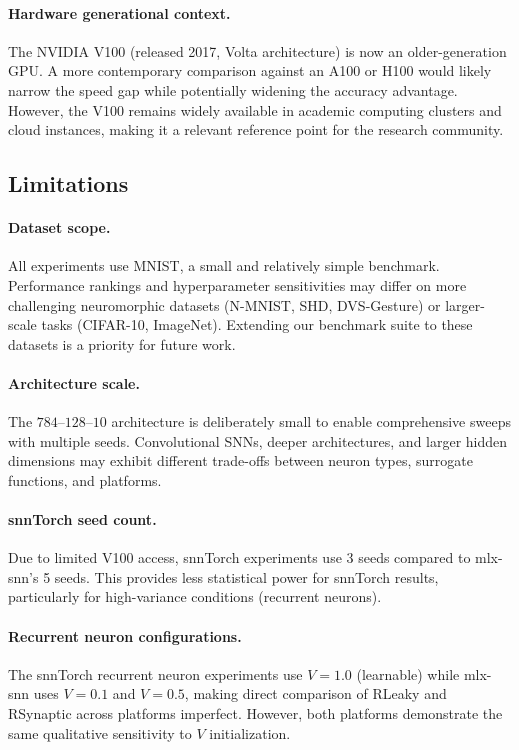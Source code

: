 \documentclass[11pt]{article}
\begin{document}
\paragraph{Hardware generational context.}
The NVIDIA V100 (released 2017, Volta architecture) is now an older-generation GPU. A more contemporary comparison against an A100 or H100 would likely narrow the speed gap while potentially widening the accuracy advantage. However, the V100 remains widely available in academic computing clusters and cloud instances, making it a relevant reference point for the research community.

\subsection{Limitations}

\paragraph{Dataset scope.}
All experiments use MNIST, a small and relatively simple benchmark. Performance rankings and hyperparameter sensitivities may differ on more challenging neuromorphic datasets (N-MNIST, SHD, DVS-Gesture) or larger-scale tasks (CIFAR-10, ImageNet). Extending our benchmark suite to these datasets is a priority for future work.

\paragraph{Architecture scale.}
The $784$--$128$--$10$ architecture is deliberately small to enable comprehensive sweeps with multiple seeds. Convolutional SNNs, deeper architectures, and larger hidden dimensions may exhibit different trade-offs between neuron types, surrogate functions, and platforms.

\paragraph{snnTorch seed count.}
Due to limited V100 access, snnTorch experiments use 3 seeds compared to mlx-snn's 5 seeds. This provides less statistical power for snnTorch results, particularly for high-variance conditions (recurrent neurons).

\paragraph{Recurrent neuron configurations.}
The snnTorch recurrent neuron experiments use $V=1.0$ (learnable) while mlx-snn uses $V=0.1$ and $V=0.5$, making direct comparison of RLeaky and RSynaptic across platforms imperfect. However, both platforms demonstrate the same qualitative sensitivity to $V$ initialization.
\end{document}

